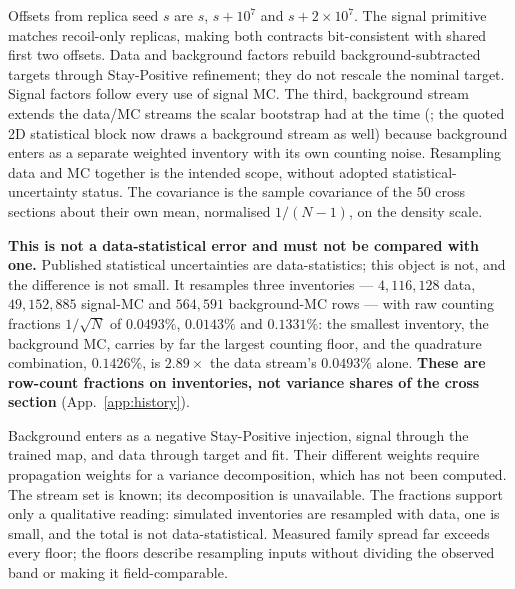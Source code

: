 Offsets from replica seed $s$ are $s$, $s+10^{7}$ and $s+2{\times}10^{7}$. The signal primitive matches recoil-only replicas, making both contracts bit-consistent with shared first two offsets. Data and background factors rebuild background-subtracted targets through Stay-Positive refinement; they do not rescale the nominal target. Signal factors follow every use of signal MC. The third, background stream extends the data/MC streams the scalar bootstrap had at the time (; the quoted 2D statistical block now draws a background stream as well) because background enters as a separate weighted inventory with its own counting noise. Resampling data and MC together is the intended scope, without adopted statistical-uncertainty status. The covariance is the sample covariance of the $50$ cross sections about their own mean, normalised $1/(N-1)$, on the density scale.

\medskip\noindent
\textbf{This is not a data-statistical error and must not be compared with one.} Published statistical uncertainties are data-statistics; this object is not, and the difference is not small. It resamples three inventories --- $4{,}116{,}128$ data, $49{,}152{,}885$ signal-MC and $564{,}591$ background-MC rows --- with raw counting fractions $1/\sqrt{N}$ of $0.0493\%$, $0.0143\%$ and $0.1331\%$: the smallest inventory, the background MC, carries by far the largest counting floor, and the quadrature combination, $0.1426\%$, is $2.89\times$ the data stream's $0.0493\%$ alone. \textbf{These are row-count fractions on inventories, not variance shares of the cross section} (App.~\ref{app:history}).

Background enters as a negative Stay-Positive injection, signal through the trained map, and data through target and fit. Their different weights require propagation weights for a variance decomposition, which has not been computed. The stream set is known; its decomposition is unavailable. The fractions support only a qualitative reading: simulated inventories are resampled with data, one is small, and the total is not data-statistical. Measured family spread far exceeds every floor; the floors describe resampling inputs without dividing the observed band or making it field-comparable.

